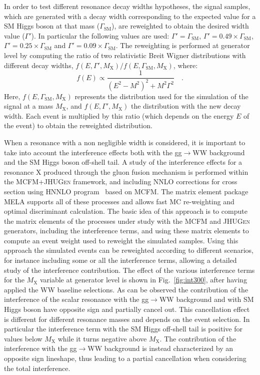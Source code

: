 In order to test different resonance decay widths hypotheses, the signal samples, which are generated with a decay width corresponding to the expected value for a SM Higgs boson at that mass ($\Gamma_\mathrm{SM}$), are reweighted to obtain the desired width value ($\Gamma'$). In particular the following values are used: $\Gamma' = \Gamma_\mathrm{SM}$, $\Gamma' = 0.49 \times \Gamma_\mathrm{SM}$, $\Gamma' = 0.25 \times \Gamma_\mathrm{SM}$ and $\Gamma' = 0.09 \times \Gamma_\mathrm{SM}$.
The reweighting is performed at generator level by computing the ratio of two relativistic Breit Wigner distributions with different decay widths, $f(E,\Gamma',M_\mathrm{X})/f(E,\Gamma_\mathrm{SM},M_\mathrm{X})$, where:
\begin{equation}
f(E) \propto \frac{1}{(E^2 - M^2)^2 + M^2\Gamma^2} \quad .
\end{equation}
Here, $f(E,\Gamma_\mathrm{SM},M_\mathrm{X})$ represents the distribution used for the simulation of the signal at a mass $M_\mathrm{X}$, and $f(E,\Gamma',M_\mathrm{X})$ the distribution with the new decay width. Each event is multiplied by this ratio (which depends on the energy $E$ of the event) to obtain the reweighted distribution.

When a resonance with a non negligible width is considered, it is important to take into account the interference effects both with the gg$\to$WW background and the SM Higgs boson off-shell tail.
A study of the interference effects for a resonance X produced through the gluon fusion mechanism is performed within the \textsc{MCFM}+\textsc{JHUGen} framework, and including NNLO corrections for cross section using \textsc{HNNLO} program~\cite{Grazzini:2008tf} based on \textsc{MCFM}. The matrix element package MELA supports all of these processes and allows fast MC re-weighting and optimal discriminant calculation. The basic idea of this approach is to compute the matrix elements of the processes under study with the \textsc{MCFM} and \textsc{JHUGen} generators, including the interference terms, and using these matrix elements to compute an event weight used to reweight the simulated samples. Using this approach the simulated events can be reweighted according to different scenarios, for instance including some or all the interference terms, allowing a detailed study of the interference contribution. The effect of the various interference terms for the $M_\mathrm{X}$ variable at generator level is shown in Fig.~\ref{fig:int300}, after having applied the WW baseline selections. As can be observed the contribution of the interference of the scalar resonance with the gg$\to$WW background 
and with SM Higgs boson have opposite sign and partially cancel out. This cancellation effect is different for different resonance masses and depends on the event selection.
In particular the interference term with the SM Higgs off-shell tail is positive for values below $M_\mathrm{X}$ while it turns negative above $M_\mathrm{X}$. The contribution of the interference with the gg$\to$WW background is instead characterized by an opposite sign lineshape, thus leading to a partial cancellation when considering the total interference.

